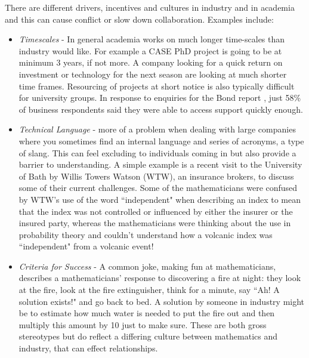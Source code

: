 \documentclass[11pt]{article} %
\begin{document}
	There are different drivers, incentives and cultures in industry and in academia and this can cause conflict or slow down collaboration. Examples include: 
	\begin{itemize}
		\item \textit{Timescales} - In general academia works on much longer time-scales than industry would like. For example a CASE PhD project is going to be at minimum 3 years, if not more. A company looking for a quick return on investment or technology for the next season are looking at much shorter time frames. Resourcing of projects at short notice is also typically difficult for university groups. In response to enquiries for the Bond report \cite{Bond}, just 58\% of business respondents said they were able to access support quickly enough. 
		\item \textit{Technical Language} -  more of a problem when dealing with large companies where you sometimes find an internal language and series of acronyms, a type of slang. This can feel excluding to individuals coming in but also provide a barrier to understanding. A simple example is a recent visit to the University of Bath by Willis Towers Watson (WTW), an insurance brokers, to discuss some of their current challenges. Some of the mathematicians were confused by WTW's use of the word ``independent" when describing an index to mean that the index was not controlled or influenced by either the insurer or the insured party, whereas the mathematicians were thinking about the use in probability theory and couldn't understand how a volcanic index was ``independent" from a volcanic event!
		\item \textit{Criteria for Success} - A common joke, making fun at mathematicians, describes  a mathematicians' response to discovering a fire at night: they look at the fire, look at the fire extinguisher, think for a minute, say ``Ah! A solution exists!" and go back to bed. A solution by someone in industry might be to estimate how much water is needed to put the fire out and then multiply this amount by 10 just to make sure. These are both gross stereotypes but do reflect a differing culture between mathematics and industry, that can effect relationships.		
	\end{itemize}

	
\end{document}

